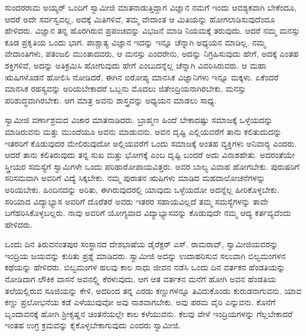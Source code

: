  ಸುಂದರರಾಮ ಅಯ್ಯರ್ ಒಂದಿಗೆ ಸ್ವಾಮೀಜಿ ಮಾತನಾಡುತ್ತಿದ್ದಾಗ ವಿಜ್ಞಾನ ನಮಗೆ ಇಂದು ಆವಶ್ಯಕವಾಗಿ ಬೇಕೆಂದೂ, ಆದರೆ ಅದೇ ಸರ್ವಸ್ವವಲ್ಲ, ಅದಕ್ಕೆ ಮಿತಿಗಳಿವೆ, ತಮ್ಮ ವೇದಾಂತ ಆ ಮಿತಿಯನ್ನು ಹೋಗಲಾಡಿಸುವುದೆಂದೂ ಹೇಳಿದರು. ವಿಜ್ಞಾನ ತನ್ನ ಹೊರಗಿರುವ ಪ್ರಪಂಚವನ್ನು ವಿಭಜನೆ ಮಾಡಿ ನಿಯಮಕ್ಕೆ ತರುವುದು. ಆದರೆ ನಮ್ಮ ಮನಸ್ಸು ಕೂಡ ಪ್ರಕೃತಿಯ ಒಂದು ಭಾಗ. ಪಾಶ್ಚಾತ್ಯ ವಿಜ್ಞಾನ ಇದನ್ನು ಇನ್ನೂ ಚೆನ್ನಾಗಿ ಅಧ್ಯಯನ ಮಾಡಿಲ್ಲ. ನಮ್ಮ ವೇದಾಂತಿಗಳು, ಪತಂಜಲಿ ಮುಂತಾದವರು, ಆ ಮನಸ್ಸು ಎಂದರೇನು, ಅದನ್ನು ನಿಗ್ರಹಿಸುವುದು ಹೇಗೆ, ಅದಕ್ಕೆ ಎಂತಹ ಶಕ್ತಿಗಳಿವೆ, ಅದನ್ನು ಅತಿಕ್ರಮಿಸಿ ಹೋಗುವುದು ಹೇಗೆ ಎಂಬುದನ್ನೆಲ್ಲ ಚೆನ್ನಾಗಿ ವಿವರಿಸಿರುವರು. ಆ ಮಹಾ ಋಷಿಗಳೊಡನೆ ಹೋಲಿಸಿ ನೋಡಿದರೆ, ಈಗಿನ ಐರೋಪ್ಯ ಮಾನಸಿಕ ವಿಜ್ಞಾನಿಗಳು ಇನ್ನೂ ಮಕ್ಕಳು. ಏಕೆಂದರೆ ಮಾನಸಿಕ ರಹಸ್ಯವನ್ನು ಅರಿಯಬೇಕಾದರೆ ಒಬ್ಬನು ಮೊದಲು ಜಿತೇಂದ್ರಿಯನಾಗಿರಬೇಕು, ಮನಸ್ಸು ಪರಿಶುದ್ಧವಾಗಿರಬೇಕು. ಆಗ ಮಾತ್ರ ಅವನು ಶಾಸ್ತ್ರವನ್ನು ಅಧ್ಯಯನ ಮಾಡಲು ಸಾಧ್ಯ. 

 ಸ್ವಾಮೀಜಿ ವರ್ಣಾಶ್ರಮದ ವಿಚಾರ ಮಾತನಾಡಿದರು. ಬ್ರಾಹ್ಮಣ ಹಿಂದೆ ಬೇಕಾದಷ್ಟು ಸಮಾಜಕ್ಕೆ ಒಳ್ಳೆಯದನ್ನು ಮಾಡಿರುವನು ಮತ್ತು ಮುಂದೆಯೂ ಅವನು ಮಾಡುವನು. ಅವನ ದೃಷ್ಟಿ ಎಲ್ಲಿಯವರೆಗೆ ತಾನು ಕಲಿತುದುದನ್ನು ಇತರರಿಗೆ ಕೊಡುವುದರ ಮೇಲಿರುವುದೋ ಅಲ್ಲಿಯವರೆಗೆ ಒಂದು ಸಮಾಜಕ್ಕೆ ಅಂತಹ ವ್ಯಕ್ತಿಗಳು ಅನಿವಾರ‍್ಯ ಎಂದರು. ಆದರೆ ತಾನು ಕಲಿತಿರುವುದು ತನ್ನ ಸುಖ ಮತ್ತು ಭೋಗಕ್ಕೆ ಎಂಬ ದೃಷ್ಟಿ ಬಂದರೆ ಅದು ವಿನಾಶಹೇತು. ಅದರಂತೆಯೇ ಸ್ತ್ರೀಯರ ಸಮಸ್ಯೆಗೆ ಸ್ವಾಮಿಗಳೇ ಒಂದು ಪರಿಹಾರೋಪಾಯವಿತ್ತರು. ಅವರ ಬಾಲ್ಯ ವಿವಾಹ ಹೋಗಬೇಕು. ಪುರುಷರಿಗೆ ಸರಿಸಮವಾಗಿ ಅವರಿಗೆ ವಿದ್ಯೆ ಸಿಕ್ಕಬೇಕು. ನಮ್ಮ ಪುರಾತನ ಋಷಿಗಳು ಮಾಡಿದ ಮಹದಾಲೋಚನೆಗಳನ್ನು ಅರಿಯಬೇಕು. ಹಿಂದಿನದನ್ನು ಅರಿತು, ಈಗಿರುವುದರಲ್ಲಿ ಯಾವುದು ಒಳ್ಳೆಯದೋ ಅದನ್ನೆಲ್ಲ ಹೀರಿಕೊಳ್ಳಬೇಕು. ಸರಿಯಾದ ವಿದ್ಯಾಭ್ಯಾಸ ಅವರಿಗೆ ದೊರೆತರೆ ಅವರು ಇತರರ ಸಹಾಯವಿಲ್ಲದೆ ತಮ್ಮ ಸಮಸ್ಯೆಗಳನ್ನು ತಾವೇ ಬಗೆಹರಿಸಿಕೊಳ್ಳಬಲ್ಲರು. ನಾವು ಅವರಿಗೆ ಯೋಗ್ಯವಾದ ವಿದ್ಯಾಭ್ಯಾಸವನ್ನು ಕೊಡುವುದೇ ನಮ್ಮ ಆದ್ಯ ಕರ್ತವ್ಯವೆಂದು ಹೇಳಿದರು. 

 ಒಂದು ದಿನ ತಿರುವನಂತಪುರ ಸಂಸ್ಥಾನದ ದೇಶಭಾಷೆಯ ಡೈರೆಕ್ಟರ್ ಎಸ್. ರಾಮರಾವ್, ಸ್ವಾಮೀಜಿಯವರನ್ನು ಇಂದ್ರಿಯ ಜಯವನ್ನು ಕುರಿತು ಪ್ರಶ್ನೆ ಮಾಡಿದರು. ಸ್ವಾಮೀಜಿ ಅದನ್ನು ಉದಾಹರಿಸುವ ಸಲುವಾಗಿ ಬಿಲ್ವಮಂಗಳನ ಕಥೆಯನ್ನು ಹೇಳಿದರು. ಬಿಲ್ವಮಂಗಳ ಹಲವು ಕಾಲ ಸಾಧು ಜೀವನ ನಡೆಸಿ ಒಂದು ದಿನ ವರ್ತಕನ ಹೆಂಡತಿಯನ್ನು ನೋಡಿದಾಗ ಲೌಕಿಕ ವಾಸನೆ ಅವನಲ್ಲ್ಲಿ ಕೆರಳುವುದು. ಆಗ ಆತ ವರ್ತಕನ ಮನೆಗೆ ಹೋಗಿ ಅವನ ಹೆಂಡತಿಯ ತಲೆಯಲ್ಲಿರುವ ಸೂಜಿಯನ್ನು ಕೇಳಿ, ಅದರಿಂದ ತನ್ನ ಎರಡು ಕಣ್ಣುಗಳನ್ನೂ ತಿವಿದುಕೊಂಡು ಕುರುಡನಾಗುವನು. ಯಾವ ಕಣ್ಣು ಪ್ರಲೋಭನೆಯ ಕಡೆ ಎಳೆಯುವುವೋ ಅವು ನಾಶವಾಗಬೇಕು. ಅವು ಪರಮ ವೈರಿ ಎನ್ನುವನು. ಕೊನೆಗೆ ಬೃಂದಾವನಕ್ಕೆ ಹೋಗಿ ಶ‍್ರೀಕೃಷ್ಣನ ಚಿಂತನೆಯಲ್ಲೇ ಕಾಲ ಕಳೆಯುವನು. ಕೆಲವು ವೇಳೆ ಇಂದ್ರಿಯಗಳನ್ನು ಗೆಲ್ಲಬೇಕಾದರೆ ಇಂತಹ ಉಗ್ರ ಕ್ರಮವನ್ನು ಕೈಕೊಳ್ಳಬೇಕಾಗುವುದು ಎಂದರು ಸ್ವಾಮೀಜಿ. 

